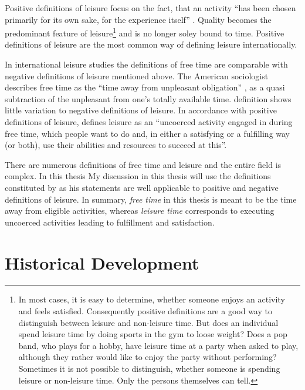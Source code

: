 \documentclass[12pt,numbers=noenddot,parskip,bibliography=totocnumbered,listof=totocnumbered,draft]{scrreprt}
\begin{document}
Positive definitions of leisure focus on the fact, that an activity ``has been chosen primarily for its own sake, for the experience itself'' \citep[p.15]{freysinger2000}. Quality becomes the predominant feature of leisure\footnote{In most cases, it is easy to determine, whether someone enjoys an activity and feels satisfied. Consequently positive definitions are a good way to distinguish between leisure and non-leisure time. But does an individual spend leisure time by doing sports in the gym to loose weight? Does a pop band, who plays for a hobby, have leisure time at a party when asked to play, although they rather would like to enjoy the party without performing? Sometimes it is not possible to distinguish, whether someone is spending leisure or non-leisure time. Only the persons themselves can tell.} and is no longer soley bound to time. Positive definitions of leisure are the most common way of defining leisure internationally.

In international leisure studies the definitions of free time are comparable with negative definitions of leisure mentioned above. The American sociologist \citeauthor{stebbins2007} describes free time as the ``time away from unpleasant obligation'' \cite[p.4]{stebbins2007}, as a quasi subtraction of the unpleasant from one's totally available time. \citeauthor{stebbins2007} definition shows little variation to negative definitions of leisure. In accordance with positive definitions of leisure, \citeauthor{stebbins2007} defines leisure as an ``uncoerced  activity engaged in during free time, which people want to do and, in either a satisfying or a fulfilling way (or both), use their abilities and resources to succeed at this''. 

There are numerous definitions of free time and leisure and the entire field is complex. In this thesis My discussion in this thesis will use the definitions constituted by \citeauthor{stebbins2007} as his statements are well applicable to positive and negative definitions of leisure. In summary, \textit{free time} in this thesis is meant to be the time away from eligible activities, whereas \textit{leisure time} corresponds to executing uncoerced activities leading to fulfillment and satisfaction.
 
\section{Historical Development}
\end{document}
